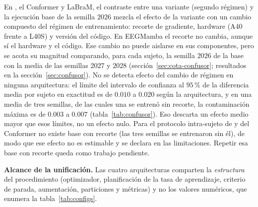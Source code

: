 En \eegnet{}, el Conformer y LaBraM, el contraste entre una variante (segundo régimen) y la
ejecución base de la semilla $2026$ mezcla el efecto de la variante con un cambio compuesto
del régimen de entrenamiento: recorte de gradiente, hardware (A40 frente a L40S) y versión
del código. En EEGMamba el recorte no cambia, aunque sí el hardware y el código. Ese cambio
no puede aislarse en sus componentes, pero se acota su magnitud comparando, para cada sujeto,
la semilla $2026$ de la base con la media de las semillas $2027$ y $2028$
(sección~\ref{sec:cota-confusor}; resultados en la sección~\ref{sec:confusor}). No se detecta
efecto del cambio de régimen en ninguna arquitectura: el límite del intervalo de confianza al
$95$\,\% de la diferencia media por sujeto en exactitud es de $0.010$ a $0.020$ según la
arquitectura, y en una media de tres semillas, de las cuales una se entrenó sin recorte, la
contaminación máxima es de $0.003$ a $0.007$ (tabla~\ref{tab:confusor}). Eso descarta un
efecto medio mayor que esos límites, no un efecto nulo. Para el protocolo intra-sujeto de
\eegnet{} y del Conformer no existe base con recorte (las tres semillas se entrenaron sin él),
de modo que ese efecto no es estimable y se declara en las limitaciones. Repetir esa base con
recorte queda como trabajo pendiente.

\textbf{Alcance de la unificación.} Las cuatro arquitecturas comparten la \emph{estructura}
del procedimiento (optimizador, planificación de la tasa de aprendizaje, criterio de parada,
aumentación, particiones y métricas) y no los valores numéricos, que enumera la
tabla~\ref{tab:configs}.

